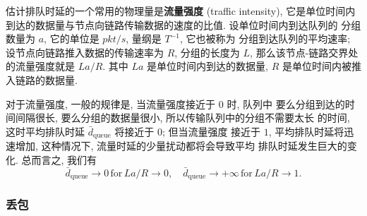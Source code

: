 \documentclass[10pt,UTF8]{book} %
\begin{document}
估计排队时延的一个常用的物理量是\textbf{流量强度} (traffic intensity),
它是单位时间内到达的数据量与节点向链路传输数据的速度的比值. 设单位时间内到达队列的
分组数量为 $a$, 它的单位是 $\si{pkt/s}$, 量纲是 $T^{-1}$, 它也被称为
分组到达队列的平均速率; 设节点向链路推入数据的传输速率为 $R$, 分组的长度为 $L$,
那么该节点-链路交界处的流量强度就是 $La/R$. 其中 $La$ 是单位时间内到达的数据量,
$R$ 是单位时间内被推入链路的数据量.

对于流量强度, 一般的规律是, {\kaishu 当流量强度接近于 $0$ 时, 队列中
要么分组到达的时间间隔很长, 要么分组的数据量很小, 所以传输队列中的分组不需要太长
的时间, 这时平均排队时延 $\bar{d}_\mathrm{queue}$ 将接近于 $0$; 但当流量强度
接近于 $1$, 平均排队时延将迅速增加, 这种情况下, 流量时延的少量扰动都将会导致平均
排队时延发生巨大的变化.}
总而言之, 我们有
\[ \bar{d}_\mathrm{queue} \to 0 \,  \text{for}  \, La/R \to 0, 
\quad \bar{d}_\mathrm{queue} \to +\infty \,  \text{for}  \, La/R \to 1. \]

\subsubsection{丢包}
\end{document}
